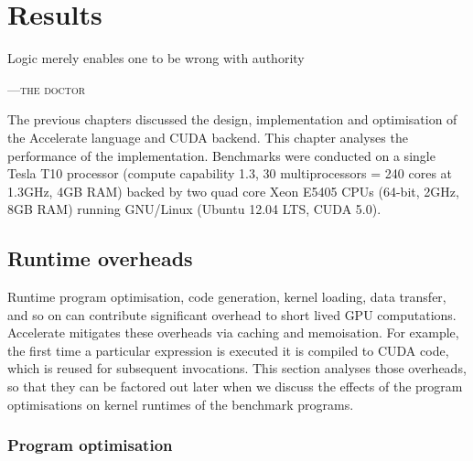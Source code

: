 %
%

\chapter{Results}
\label{ch:results}


\epigraph{Logic merely enables one to be wrong with authority}%
{\textsc{---the doctor}} %


The previous chapters discussed the design, implementation and optimisation of
the Accelerate language and CUDA backend. This chapter analyses the performance
of the implementation. Benchmarks were conducted on a single Tesla T10 processor
(compute capability 1.3, 30 multiprocessors = 240 cores at 1.3GHz, 4GB RAM)
backed by two quad core Xeon E5405 CPUs (64-bit, 2GHz, 8GB RAM) running
GNU/Linux (Ubuntu 12.04 LTS, CUDA 5.0).


\section{Runtime overheads}

Runtime program optimisation, code generation, kernel loading, data transfer,
and so on can contribute significant overhead to short lived GPU computations.
Accelerate mitigates these overheads via caching and memoisation. For example,
the first time a particular expression is executed it is compiled to CUDA code,
which is reused for subsequent invocations. This section analyses those
overheads, so that they can be factored out later when we discuss the effects of
the program optimisations on kernel runtimes of the benchmark programs.


\subsection{Program optimisation}



